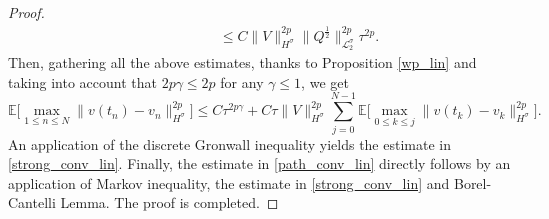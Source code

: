 \documentclass[a4paper]{amsart}
\begin{document}
\begin{proof}
\begin{align*}
     &\hspace{2cm}\le  C\|V\|^{2p}_{H^\sigma}\big\|Q^{\frac{1}{2}}\big\|^{2p}_{\mathcal{L}_2^\sigma}\tau^{2p}.
\end{align*}
Then, gathering all the above estimates, thanks to Proposition \ref{wp_lin} and taking into account that $2p\gamma\le 2p$ for any $\gamma\le 1$, we get
$$
\mathbb{E}\big[\max_{1\le n\le N}\|v(t_n)-v_n\|^{2p}_{H^\sigma}\big] \le C\tau^{2p\gamma}+C \tau \|V\|^{2p}_{H^\sigma} \displaystyle\sum_{j=0}^{N-1}\mathbb{E}\big[\max_{0\le k\le j}\|v(t_k)-v_k\|^{2p}_{H^\sigma}\big].
$$
An application of the discrete Gronwall inequality yields the estimate in \eqref{strong_conv_lin}. Finally, the estimate in \eqref{path_conv_lin} directly follows by an application of Markov inequality, the estimate in \eqref{strong_conv_lin} and Borel-Cantelli Lemma. The proof is completed.
\end{proof}
\end{document}
